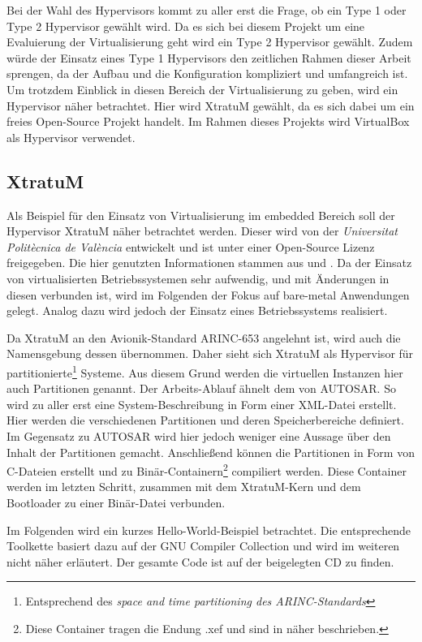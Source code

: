 \documentclass[
  a4paper,					    %
  twoside,
  DIV=calc,     				%
  bibliography=totoc,
  cleardoublepage=empty,
  ngerman,     					%
  final       					%
]{scrbook}
\begin{document}
Bei der Wahl des Hypervisors kommt zu aller erst die Frage, ob ein Type 1 oder Type 2 Hypervisor gewählt wird. Da es sich bei diesem Projekt um eine Evaluierung der Virtualisierung geht wird ein Type 2 Hypervisor gewählt. Zudem würde der Einsatz eines Type 1 Hypervisors den zeitlichen Rahmen dieser Arbeit sprengen, da der Aufbau und die Konfiguration kompliziert und umfangreich ist. Um trotzdem Einblick in diesen Bereich der Virtualisierung zu geben, wird ein Hypervisor näher betrachtet. Hier wird XtratuM gewählt, da es sich dabei um ein freies Open-Source Projekt handelt. Im Rahmen dieses Projekts wird VirtualBox als Hypervisor verwendet.

\subsection{XtratuM}
\label{sec:xtratum}
Als Beispiel für den Einsatz von Virtualisierung im embedded Bereich soll der Hypervisor XtratuM näher betrachtet werden. Dieser wird von der \emph{Universitat Politècnica de València} entwickelt und ist unter einer Open-Source Lizenz freigegeben. Die hier genutzten Informationen stammen aus \cite{xm:usermanual} und \cite{xm:reference}. Da der Einsatz von virtualisierten Betriebssystemen sehr aufwendig, und mit Änderungen in diesen verbunden ist, wird im Folgenden der Fokus auf bare-metal Anwendungen gelegt. Analog dazu wird jedoch der Einsatz eines Betriebssystems realisiert.

Da XtratuM an den Avionik-Standard ARINC-653 angelehnt ist, wird auch die Namensgebung dessen übernommen. Daher sieht sich XtratuM als Hypervisor für partitionierte\footnote{Entsprechend des \emph{space and time partitioning des ARINC-Standards}} Systeme. Aus diesem Grund werden die virtuellen Instanzen hier auch Partitionen genannt. Der Arbeits-Ablauf ähnelt dem von AUTOSAR. So wird zu aller erst eine System-Beschreibung in Form einer XML-Datei erstellt. Hier werden die verschiedenen Partitionen und deren Speicherbereiche definiert. Im Gegensatz zu AUTOSAR wird hier jedoch weniger eine Aussage über den Inhalt der Partitionen gemacht. Anschließend können die Partitionen in Form von C-Dateien erstellt und zu Binär-Containern\footnote{Diese Container tragen die Endung .xef und sind in \cite[Seite 68]{xm:usermanual} näher beschrieben.} compiliert werden. Diese Container werden im letzten Schritt, zusammen mit dem XtratuM-Kern und dem Bootloader zu einer Binär-Datei verbunden.

Im Folgenden wird ein kurzes Hello-World-Beispiel betrachtet. Die entsprechende Toolkette basiert dazu auf der GNU Compiler Collection und wird im weiteren nicht näher erläutert. Der gesamte Code ist auf der beigelegten CD zu finden. 
\end{document}
